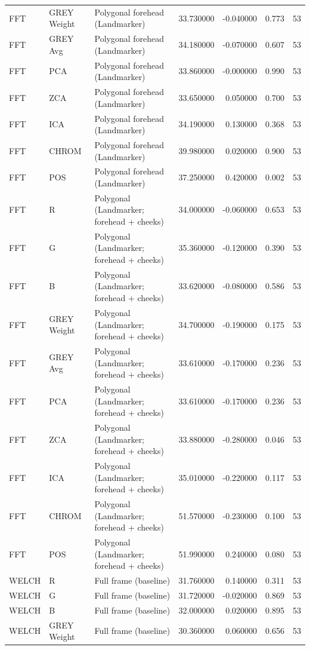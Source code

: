 \begin{table}[htbp]
\begin{tabular}{l l l r r l r}
FFT & GREY Weight & Polygonal forehead (Landmarker) & 33.730000 & -0.040000 & 0.773 & 53 \\
FFT & GREY Avg & Polygonal forehead (Landmarker) & 34.180000 & -0.070000 & 0.607 & 53 \\
FFT & PCA & Polygonal forehead (Landmarker) & 33.860000 & -0.000000 & 0.990 & 53 \\
FFT & ZCA & Polygonal forehead (Landmarker) & 33.650000 & 0.050000 & 0.700 & 53 \\
FFT & ICA & Polygonal forehead (Landmarker) & 34.190000 & 0.130000 & 0.368 & 53 \\
FFT & CHROM & Polygonal forehead (Landmarker) & 39.980000 & 0.020000 & 0.900 & 53 \\
FFT & POS & Polygonal forehead (Landmarker) & 37.250000 & 0.420000 & 0.002 & 53 \\
FFT & R & Polygonal (Landmarker; forehead + cheeks) & 34.000000 & -0.060000 & 0.653 & 53 \\
FFT & G & Polygonal (Landmarker; forehead + cheeks) & 35.360000 & -0.120000 & 0.390 & 53 \\
FFT & B & Polygonal (Landmarker; forehead + cheeks) & 33.620000 & -0.080000 & 0.586 & 53 \\
FFT & GREY Weight & Polygonal (Landmarker; forehead + cheeks) & 34.700000 & -0.190000 & 0.175 & 53 \\
FFT & GREY Avg & Polygonal (Landmarker; forehead + cheeks) & 33.610000 & -0.170000 & 0.236 & 53 \\
FFT & PCA & Polygonal (Landmarker; forehead + cheeks) & 33.610000 & -0.170000 & 0.236 & 53 \\
FFT & ZCA & Polygonal (Landmarker; forehead + cheeks) & 33.880000 & -0.280000 & 0.046 & 53 \\
FFT & ICA & Polygonal (Landmarker; forehead + cheeks) & 35.010000 & -0.220000 & 0.117 & 53 \\
FFT & CHROM & Polygonal (Landmarker; forehead + cheeks) & 51.570000 & -0.230000 & 0.100 & 53 \\
FFT & POS & Polygonal (Landmarker; forehead + cheeks) & 51.990000 & 0.240000 & 0.080 & 53 \\
WELCH & R & Full frame (baseline) & 31.760000 & 0.140000 & 0.311 & 53 \\
WELCH & G & Full frame (baseline) & 31.720000 & -0.020000 & 0.869 & 53 \\
WELCH & B & Full frame (baseline) & 32.000000 & 0.020000 & 0.895 & 53 \\
WELCH & GREY Weight & Full frame (baseline) & 30.360000 & 0.060000 & 0.656 & 53 \\

\end{tabular}
\end{table}
